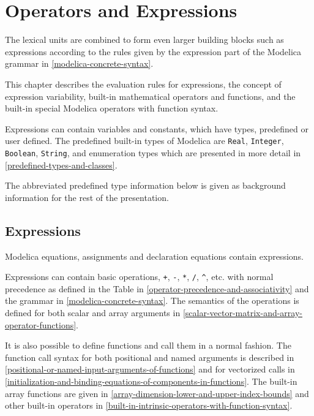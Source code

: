 \chapter{Operators and Expressions}

The lexical units are combined to form even larger building blocks such
as expressions according to the rules given by the expression part of
the Modelica grammar in \autoref{modelica-concrete-syntax}.

This chapter describes the evaluation rules for expressions, the concept
of expression variability, built-in mathematical operators and
functions, and the built-in special Modelica operators with function
syntax.

Expressions can contain variables and constants, which have types,
predefined or user defined. The predefined built-in types of Modelica
are \lstinline!Real!, \lstinline!Integer!, \lstinline!Boolean!, \lstinline!String!, and enumeration types which are
presented in more detail in \autoref{predefined-types-and-classes}.

\begin{nonnormative}
The abbreviated predefined type information below is given as background information for the rest of the presentation.
\end{nonnormative}

\section{Expressions}

Modelica equations, assignments and declaration equations contain
expressions.

Expressions can contain basic operations, \lstinline!+!, \lstinline!-!, \lstinline!*!, \lstinline!/!, \lstinline!^!, etc. with
normal precedence as defined in the Table in \autoref{operator-precedence-and-associativity} and the grammar
in \autoref{modelica-concrete-syntax}. The semantics of the operations is defined for both
scalar and array arguments in \autoref{scalar-vector-matrix-and-array-operator-functions}.

It is also possible to define functions and call them in a normal
fashion. The function call syntax for both positional and named
arguments is described in \autoref{positional-or-named-input-arguments-of-functions} and for vectorized calls in
\autoref{initialization-and-binding-equations-of-components-in-functions}. The built-in array functions are given in \autoref{array-dimension-lower-and-upper-index-bounds}
and other built-in operators in \autoref{built-in-intrinsic-operators-with-function-syntax}.

